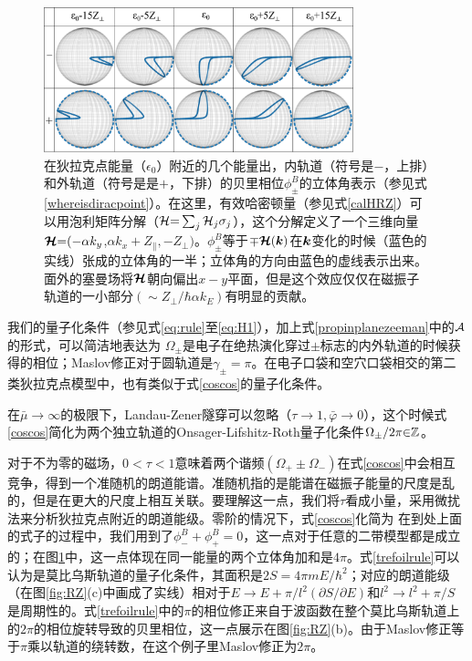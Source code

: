 \begin{figure}
	\includegraphics[width=0.8\textwidth]{../figures/blochsphere.png}
	\centering
	\caption{在狄拉克点能量（$\epsilon_0$）附近的几个能量出，内轨道（符号是$-$，上排）和外轨道（符号是是$+$，下排）的贝里相位$\phi_{\pm}^B$的立体角表示（参见式\ref{whereisdiracpoint}）。在这里，有效哈密顿量（参见式\ref{calHRZ}）可以用泡利矩阵分解（${\cal H}{=}\sum_j{\cal H}_j\sigma_j$），这个分解定义了一个三维向量$\boldsymbol{{\cal H}}{=}({-}\alpha k_y$,$\alpha k_x{+}Z_\parallel,{-}Z_\perp)$。$\phi_{\pm}^B$等于${\mp} \boldsymbol{{\cal H}}(\boldsymbol{k})$在$\boldsymbol{k}$变化的时候（蓝色的实线）张成的立体角的一半\cite{berry_quantal_1984}；立体角的方向由蓝色的虚线表示出来。面外的塞曼场将$\boldsymbol{{\cal H}}$朝向偏出$x-y$平面，但是这个效应仅仅在磁振子轨道的一小部分$(\sim Z_{\perp}/\hbar \alpha k_E)$有明显的贡献。\label{fig:blochsphere}}
\end{figure}

我们的量子化条件（参见式\ref{eq:rule}至\ref{eq:H1}），加上式\ref{propinplanezeeman}中的${\cal A}$的形式，可以简洁地表达为
$\Omega_{\pm}$是电子在绝热演化穿过$\pm$标志的内外轨道的时候获得的相位；Maslov修正对于圆轨道是$\gamma_{\pm}{=}\pi$。在电子口袋和空穴口袋相交的第二类狄拉克点模型中，也有类似于式\ref{coscos}的量子化条件\cite{AALG}。

在$\bar{\mu}{\rightarrow} \infty$的极限下，Landau-Zener隧穿可以忽略（$\tau{\rightarrow}1,\bar{\varphi}{\rightarrow}0$），这个时候式\ref{coscos}简化为两个独立轨道的Onsager-Lifshitz-Roth量子化条件$\Omega_{\pm}/2\pi{\in}\mathbb{Z}$。

对于不为零的磁场，$0{<}\tau{<}1$意味着两个谐频$(\Omega_+{\pm}\Omega_-)$在式\ref{coscos}中会相互竞争，得到一个准随机的朗道能谱\cite{kaganov_coherent_1983}。准随机指的是能谱在磁振子能量的尺度是乱的，但是在更大的尺度上相互关联。要理解这一点，我们将$\tau$看成小量，采用微扰法来分析狄拉克点附近的朗道能级。零阶的情况下，式\ref{coscos}化简为
在到处上面的式子的过程中，我们用到了$\phi^B_-{+}\phi^B_+{=}0$，这一点对于任意的二带模型都是成立的；在图\ref{fig:blochsphere}中，这一点体现在同一能量的两个立体角加和是$4\pi$。式\ref{trefoilrule}可以认为是莫比乌斯轨道的量子化条件，其面积是$2S{=}4\pi m E{/\hbar^2}$；对应的朗道能级（在图\ref{fig:RZ}(c)中画成了实线）相对于$E{\rightarrow}E{+}\pi/l^2(\partial S/\partial E)$和$l^2{\rightarrow}l^2{+}\pi/S$是周期性的。式\ref{trefoilrule}中的$\pi$的相位修正来自于波函数在整个莫比乌斯轨道上的$2\pi$的相位旋转导致的贝里相位，这一点展示在图\ref{fig:RZ}(b)。由于Maslov修正等于$\pi$乘以轨道的绕转数，在这个例子里Maslov修正为$2\pi$。

